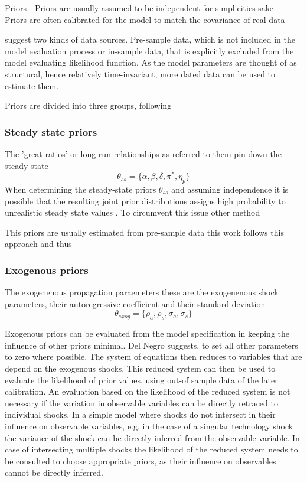 \documentclass[11pt,a4paper,english]{article} %
\begin{document}
	Priors \cite{del_negro_forming_2008}
	- Priors are usually assumed to be independent for simplicities sake
	- Priors are often calibrated for the model to match the covariance of real data
		
	\cite{del_negro_forming_2008} suggest two kinds of data sources. Pre-sample data, which is not included in the model evaluation process or in-sample data, that is explicitly excluded from the model evaluating likelihood function.
	As the model parameters are thought of as structural, hence relatively time-invariant, more dated data can be used to estimate them. 
	
	Priors are divided into three groups, following \cite{del_negro_forming_2008}
	
	\subsubsection{Steady state priors}
	The 'great ratios' or long-run relationships as \cite{kydland_time_1982} referred to them pin down the steady state
	\[
		\theta_{ss} = \{\alpha, \beta, \delta, \pi^*, \eta_p\} %
	\]
	When determining the steady-state priors $\theta_{ss}$ and assuming independence it is possible that the resulting joint prior distributions assigns high probability to unrealistic steady state values \cite{del_negro_forming_2008}. To circumvent this issue other method
	
	This priors are usually estimated from pre-sample data \cite{herbst_bayesian_2014}
	this work follows this approach and thus 
	
	
	
	
	\subsubsection{Exogenous priors}
	The exogenenous propagation paraemeters 
	these are the exogenenous shock parameters, their autoregressive coefficient and their standard deviation
	\[
		\theta_{exog} = \{\rho_a, \rho_s, \sigma_a, \sigma_s \}
	\]
	
	Exogenous priors can be evaluated from the model specification in keeping the influence of other priors minimal. Del Negro suggests, to set all other parameters to zero where possible. The system of equations then reduces to variables that are depend on the exogenous shocks. This reduced system can then be used to evaluate the likelihood of prior values, using out-of sample data of the later calibration. 
	An evaluation based on the likelihood of the reduced system is not necessary if the variation in observable variables can be directly retraced to individual shocks. In a simple model where shocks do not intersect in their influence on observable variables, e.g. in the case of a singular technology shock the variance of the shock can be directly inferred from the observable variable. In case of intersecting multiple shocks the likelihood of the reduced system needs to be consulted to choose appropriate priors, as their influence on observables cannot be directly inferred. 
	
\end{document}
